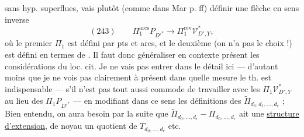 sans hyp. superflues,  vais plutôt (comme dans Mar p.  ff) définir une flèche en sens inverse
\[
(243)\qquad\Pi_1^{\mathrm{arcs}}P_{D'^{*}}\longrightarrow\Pi_1^{\mathrm{rev}}\mathcal V^{*}_{D',Y},
\]
où le premier $\Pi_1$ est défini par pts et arcs, et le deuxième (on n'a pas le choix !) est défini en termes de . Il faut donc généraliser en contexte présent les considérations du loc. cit. Je ne vais pas entrer dans le détail ici --- d'autant moins que je ne vois pas clairement à présent dans quelle mesure le th.  est indispensable --- s'il n'est pas tout aussi commode   de travailler avec les $\Pi_1\mathcal V^{*}_{D',Y}$ au lieu des $\Pi_1P_{D'^{*}}$ --- en modifiant dans ce sens les définitions des $\widetilde\Pi_{d_0,d_1,\ldots,d_r}$ ; Bien entendu, on aura besoin par la suite que $\widetilde\Pi_{d_0,\ldots,d_r}\mathbin{-}\Pi_{d_0,\ldots,d_r}$ ait une \uline{structure d'extension}, de noyau un quotient de $T_{d_0,\ldots,d_r}$ etc.
